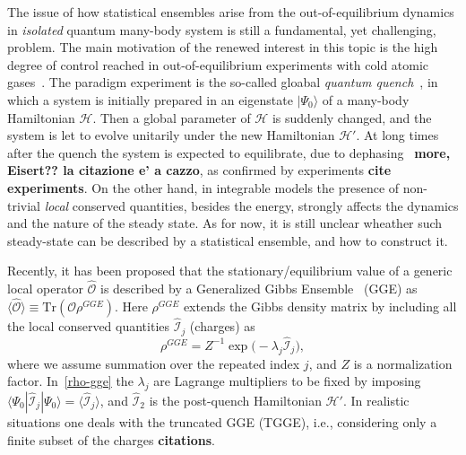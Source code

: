 \documentclass[twocolumn,superscriptaddress,prb,10pt]{revtex4-1}
\begin{document}
The issue of how statistical ensembles arise from the out-of-equilibrium 
dynamics in {\it isolated} quantum many-body system is still a fundamental, 
yet challenging, problem. The main motivation of the renewed interest 
in this topic is the high degree of control reached in out-of-equilibrium 
experiments with cold atomic gases~\cite{greiner-2002,kinoshita-2006,
hofferberth-2007,bloch-2008,trotzky-2012,gring-2012,cheneau-2012,
schneider-2012,kunhert-2013,langen-2013,meinert-2013,fukuhara-2013,
ronzheimer-2013,braun-2014}. 
The paradigm experiment is the so-called gloabal {\it quantum quench}~\cite{
polkovnikov-2011}, in which a system is initially prepared in an eigenstate 
$|\Psi_0\rangle$ of a many-body Hamiltonian ${\mathcal H}$. Then a global 
parameter of ${\mathcal H}$ is suddenly changed, and the system is let to evolve 
unitarily under the new Hamiltonian ${\mathcal H}'$. 
At long times after the quench the system is expected to equilibrate, due to 
dephasing~\cite{barthel-2008} {\bf more, Eisert??  la citazione e' a cazzo}, as confirmed by experiments {\bf cite experiments}. 
On the other hand, in integrable models the 
presence of non-trivial {\it local} conserved quantities, besides the energy, 
strongly affects the dynamics and the nature of the steady state. As for now,  
it is still unclear wheather such steady-state can be described by a statistical 
ensemble, and how to construct it. 

Recently, it has been proposed that the stationary/equilibrium value of a generic local 
operator $\hat{\mathcal O}$ is described by a Generalized Gibbs Ensemble~\cite{
rigol-2008} (GGE) as $\langle\hat{\mathcal O}\rangle\equiv\textrm{Tr}({\mathcal O}
\rho^{GGE})$. Here $\rho^{GGE}$ extends the Gibbs density matrix by including  all 
the local conserved quantities $\hat {\mathcal I}_j$ (charges) as 
%
\begin{equation}
\rho^{GGE}=Z^{-1}\exp\big(-\lambda_j\hat{\mathcal I}_j\big),
\label{rho-gge}
\end{equation}
%
where we assume summation over the repeated index $j$, and $Z$ is a normalization 
factor. In~\eqref{rho-gge} the $\lambda_j$ are Lagrange multipliers to be fixed 
by imposing $\langle\Psi_0|\hat{\mathcal I}_j|\Psi_0\rangle=\langle\hat{\mathcal 
I}_j\rangle$, and $\hat{\mathcal I}_2$ is the post-quench Hamiltonian ${\mathcal 
H}'$. In realistic situations one deals with the truncated GGE (TGGE), i.e., 
considering only a finite subset of the charges {\bf citations}. 
\end{document}
